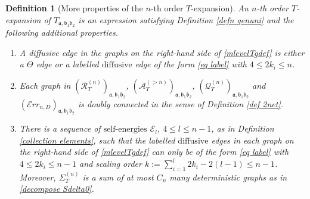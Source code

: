\documentclass{article}
\newcommand{\1}{\mathds{1}}
\numberwithin{equation}{section}
\newcommand{\be}{\begin{equation}}
\newcommand{\ee}{\end{equation}}
\newcommand{\fa}{{\mathfrak a}}
\newcommand{\fb}{{\mathfrak b}}
\renewcommand{\leq}{\leqslant}
\renewcommand{\le}{\leq}
\newcommand{\dashed}{\text{diffusive}}
\newcommand{\selfs}{\text{self-energies}}
\DeclareMathOperator{\OO}{O}
\theoremstyle{plain} %
\newtheorem{definition}[theorem]{Definition}
\theoremstyle{remark}
\newcommand{\Sdelta}{{\Sigma}_T}
\newcommand{\Sele}{{\mathcal E}}
\newcommand{\PTn}{\mathcal R_T^{(n)}}
\newcommand{\QTn}{\mathcal Q_T^{(n)}}
\newcommand{\ATn}{\mathcal A_T^{(>n)}}
\newcommand{\Err}{{\mathcal Err}}
\begin{document}
\begin{definition} [More properties of the $n$-th order $T$-expansion]
\label{def genuni}
An $n$-th order $T$-expansion of $T_{\fa,\fb_1 \fb_2}$ is an expression satisfying Definition \ref{defn genuni} and the following additional properties.


\begin{enumerate}

\item A diffusive edge in the graphs on the right-hand side of \eqref{mlevelTgdef} is either a $\Theta$ edge or a labelled $\dashed$ edge of the form \eqref{eq label} with $4\le 2k_i \le n$. %

\item Each graph in $(\PTn)_{\fa,\fb_1\fb_2}$, $(\ATn)_{\fa,\fb_1\fb_2}$, $(\QTn)_{\fa,\fb_1\fb_2}$ and $(\Err_{n,D})_{\fa,\fb_1\fb_2}$ is doubly connected in the sense of Definition \ref{def 2net}. %

\iffalse
\item There is a sequence of $\selfs$ $\Sele_{l}$, $4\le l \le n-1$, as in Definition \ref{collection elements}, such that the labelled $\dashed$ edges in each graph on the right-hand side of \eqref{mlevelTgdef} can only be of the form \eqref{eq label} with $4\le 2k_i \le n-1$ and scaling order $k:=\sum_{i=1}^l 2 k_i -2(l-1)\le n-1$. Moreover, $\Sdelta^{(n)}$ is a sum of at most $C_n$ many deterministic graphs as in \eqref{decompose Sdelta0}. 


\end{enumerate}
\end{definition}
\end{document}
